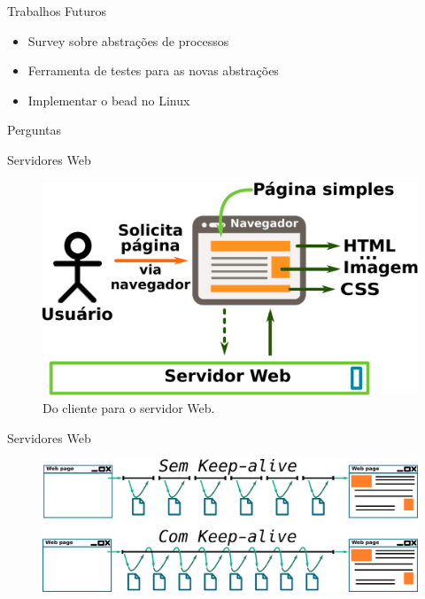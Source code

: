 \documentclass[xcolor={usenames,svgnames,dvipsnames},brazil,english,12pt,aspectratio=149]{beamer}
\begin{document}
\begin{frame}{Trabalhos Futuros}
  \begin{itemize}
    \item Survey sobre abstrações de processos
    \item Ferramenta de testes para as novas abstrações
    \item Implementar o bead no Linux
  \end{itemize}
\end{frame}

\begin{frame}{Perguntas}
  \tableofcontents
\end{frame}

\appendix

\begin{frame}{Servidores Web}
  \begin{figure}[!h]
    \centering
    \includegraphics[width=.8\textwidth]{request_a_page}
    \caption*{Do cliente para o servidor Web.}
  \end{figure}
\end{frame}

\begin{frame}{Servidores Web}
  \begin{figure}[!h]
    \centering
    \includegraphics[width=\textwidth]{with_without_keep_alive}
  \end{figure}
\end{frame}
\end{document}
